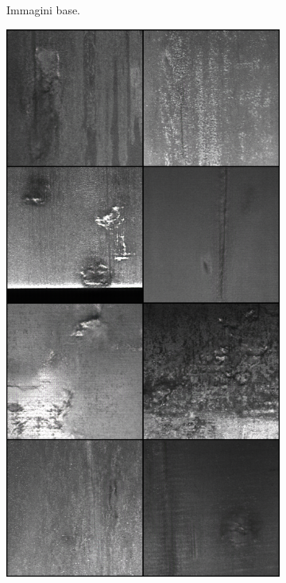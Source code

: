 \begin{figure}[htpb]
\begin{subfigure}[b]{0.3\textwidth}
        \caption{Immagini base.}
        \label{fig:good_example_1}
    \end{subfigure}
    \hfill
    \begin{subfigure}[b]{0.3\textwidth}
        \includegraphics[width=\textwidth]{imgs/Coigan/results/buone/media_images_fake_image_210000_c481d86d1cc2f7258c70.png}

\end{subfigure}
\end{figure}
